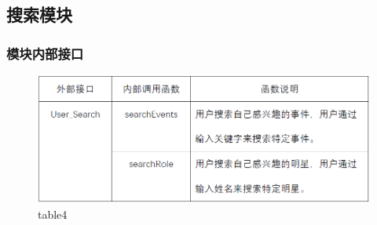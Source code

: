 \subsection{搜索模块}
\subsubsection{模块内部接口}
\begin{figure}[!htbp]
	\centering
	\includegraphics[scale=0.7]{image/b4.png} %
	\caption{table4} %
\end{figure}
